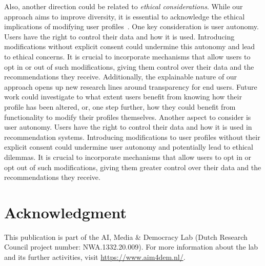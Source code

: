 \documentclass[runningheads]{llncs}
\begin{document}
Also, another direction could be related to 
\textit{ethical considerations}. 
While our approach aims to improve diversity, it is essential to acknowledge the ethical implications of modifying user profiles~\cite{Grisse2023Manipulation}. 
One key consideration is user autonomy. 
Users have the right to control their data and how it is used. 
Introducing modifications without explicit consent could undermine this autonomy and lead to ethical concerns. 
It is crucial to incorporate mechanisms that allow users to opt in or out of such modifications, giving them control over their data and the recommendations they receive.
Additionally, the explainable nature of our approach opens up new research lines around transparency for end users. 
Future work could investigate to what extent users benefit from knowing how their profile has been altered, or, one step further, how they could benefit from functionality to modify their profiles themselves.  
Another aspect to consider is user autonomy. Users have the right to control their data and how it is used in recommendation systems. 
Introducing modifications to user profiles without their explicit consent could undermine user autonomy and potentially lead to ethical dilemmas. 
It is crucial to incorporate mechanisms that allow users to opt in or opt out of such modifications, giving them greater control over their data and the recommendations they receive.

\section*{Acknowledgment}
This publication is part of the AI, Media \& Democracy Lab (Dutch Research Council project number: NWA.1332.20.009). For more information about the lab and its further activities, visit \url{https://www.aim4dem.nl/}.


%
%
%


%
\end{document}
